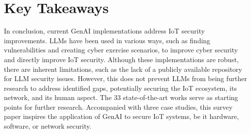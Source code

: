 \section{Key Takeaways} \label{sec:conclusions}
%
In conclusion, current GenAI implementations address IoT security improvements.
LLMs have been used in various ways, such as finding vulnerabilities and creating cyber exercise scenarios, to improve cyber security and directly improve IoT security.
Although these implementations are robust, there are inherent limitations, such as the lack of a publicly available repository for LLM security issues.
However, this does not prevent LLMs from being further research to address identified gaps, potentially securing the IoT ecosystem, its network, and its human aspect.
The 33 state-of-the-art works serve as starting points for further research. 
Accompanied with three case studies, this survey paper inspires the application of GenAI to secure IoT systems, be it hardware, software, or network security.